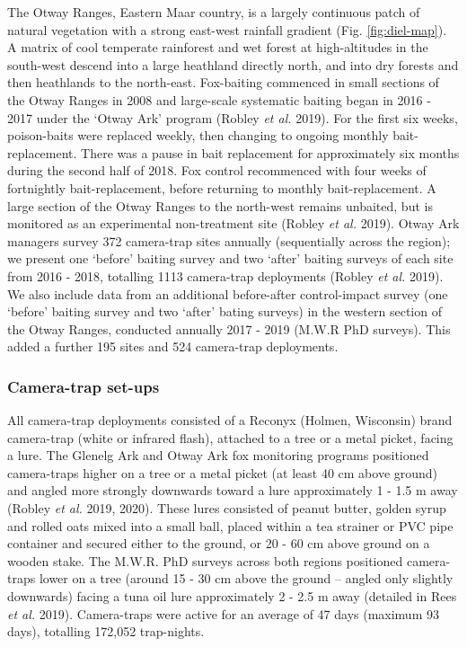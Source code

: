 \documentclass[11pt,a4paper,titlepage,twoside,openright]{style/unimelbthesis}
\begin{document}
\begin{mainmatter}
The Otway Ranges, Eastern Maar country, is a largely continuous patch of natural vegetation with a strong east-west rainfall gradient (Fig. \ref{fig:diel-map}). A matrix of cool temperate rainforest and wet forest at high-altitudes in the south-west descend into a large heathland directly north, and into dry forests and then heathlands to the north-east. Fox-baiting commenced in small sections of the Otway Ranges in 2008 and large-scale systematic baiting began in 2016 - 2017 under the `Otway Ark' program (Robley \emph{et al.} 2019). For the first six weeks, poison-baits were replaced weekly, then changing to ongoing monthly bait-replacement. There was a pause in bait replacement for approximately six months during the second half of 2018. Fox control recommenced with four weeks of fortnightly bait-replacement, before returning to monthly bait-replacement. A large section of the Otway Ranges to the north-west remains unbaited, but is monitored as an experimental non-treatment site (Robley \emph{et al.} 2019). Otway Ark managers survey 372 camera-trap sites annually (sequentially across the region); we present one `before' baiting survey and two `after' baiting surveys of each site from 2016 - 2018, totalling 1113 camera-trap deployments (Robley \emph{et al.} 2019). We also include data from an additional before-after control-impact survey (one `before' baiting survey and two `after' bating surveys) in the western section of the Otway Ranges, conducted annually 2017 - 2019 (M.W.R PhD surveys). This added a further 195 sites and 524 camera-trap deployments.

\hypertarget{camera-trap-set-ups-1}{%
\subsubsection{Camera-trap set-ups}\label{camera-trap-set-ups-1}}

All camera-trap deployments consisted of a Reconyx (Holmen, Wisconsin) brand camera-trap (white or infrared flash), attached to a tree or a metal picket, facing a lure. The Glenelg Ark and Otway Ark fox monitoring programs positioned camera-traps higher on a tree or a metal picket (at least 40 cm above ground) and angled more strongly downwards toward a lure approximately 1 - 1.5 m away (Robley \emph{et al.} 2019, 2020). These lures consisted of peanut butter, golden syrup and rolled oats mixed into a small ball, placed within a tea strainer or PVC pipe container and secured either to the ground, or 20 - 60 cm above ground on a wooden stake. The M.W.R. PhD surveys across both regions positioned camera-traps lower on a tree (around 15 - 30 cm above the ground -- angled only slightly downwards) facing a tuna oil lure approximately 2 - 2.5 m away (detailed in Rees \emph{et al.} 2019). Camera-traps were active for an average of 47 days (maximum 93 days), totalling 172,052 trap-nights.


\end{mainmatter}
\end{document}
